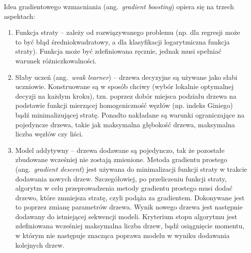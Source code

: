 \documentclass[12pt,a4paper,twoside,openany]{book}
\begin{document}
Idea gradientowego wzmacniania (ang.~\textit{gradient boosting}) opiera się na trzech aspektach:
\begin{enumerate}
\item Funkcja straty – zależy od rozwiązywanego problemu (np. dla regresji może to być błąd średniokwadratowy, a dla klasyfikacji logarytmiczna funkcja straty). Funkcja może być zdefiniowana ręcznie, jednak musi spełniać warunek różniczkowalności.
\item Słaby uczeń (ang.~\textit{weak learner}) – drzewa decyzyjne są używane jako słabi uczniowie. Konstruowane są w sposób chciwy (wybór lokalnie optymalnej decyzji na każdym kroku), tzn. poprzez dobór miejsca podziału drzewa na podstawie funkcji mierzącej homogeniczność węzłów (np. indeks Giniego) bądź minimalizującej stratę. Ponadto nakładane są warunki ograniczające na pojedyncze drzewa, takie jak maksymalna głębokość drzewa, maksymalna liczba węzłów czy liści.
\item Model addytywny – drzewa dodawane są pojedynczo, tak że pozostałe zbudowane wcześniej nie zostają zmienione. Metoda gradientu prostego (ang.~\textit{gradient descent}) jest używana do minimalizacji funkcji straty w trakcie dodawania nowych drzew. Szczegółowiej, po przeliczeniu funkcji straty, algorytm w celu przeprowadzenia metody gradientu prostego musi dodać drzewo, które zmniejsza stratę, czyli podąża za gradientem. Dokonywane jest to poprzez zmianę parametrów drzewa. Wynik nowego drzewa jest następnie dodawany do istniejącej sekwencji modeli. Kryterium stopu algorytmu jest zdefiniowana wcześniej maksymalna liczba drzew, bądź osiągnięcie momentu, w którym nie następuje znacząca poprawa modelu w wyniku dodawania kolejnych drzew.
\end{enumerate}
\end{document}
